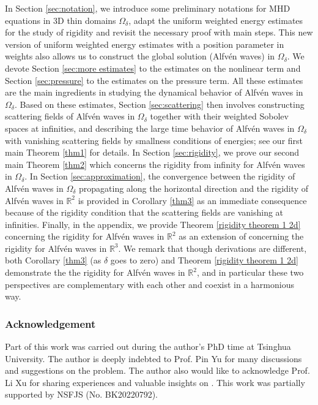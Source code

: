 \documentclass[10pt,reqno]{amsart}
\numberwithin{equation}{section}
\begin{document}
 
 In Section \ref{sec:notation}, we introduce  
 some preliminary notations for  MHD equations in 3D thin domains $\Omega_{\delta}$, adapt 
 the uniform weighted energy estimates for the study of rigidity 
 and revisit the 
 necessary proof with main steps. This new version of uniform weighted energy estimates  with a position parameter in weights 
 also allows us to construct the global solution (Alfv\'en waves) in $\Omega_{\delta}$. We  devote Section \ref{sec:more estimates} 
 to the  estimates on the nonlinear term and  Section \ref{sec:pressure}  
to the estimates on the pressure term. 
All these estimates are the main ingredients in 
studying the dynamical behavior of Alfv\'en waves in $\Omega_{\delta}$. Based on these estimates, Section \ref{sec:scattering} then 
involves constructing scattering fields of Alfv\'en waves in $\Omega_{\delta}$ together with their weighted Sobolev spaces at infinities, and describing the large time behavior of  Alfv\'en waves in $\Omega_{\delta}$ with vanishing scattering fields 
by smallness conditions of energies; see our first main Theorem \ref{thm1} for details. In Section \ref{sec:rigidity}, we prove our second main Theorem \ref{thm2} which concerns the rigidity from infinity for Alfv\'en waves in $\Omega_{\delta}$. In Section \ref{sec:approximation}, the 
convergence between the rigidity of Alfv\'en waves in $\Omega_{\delta}$ propagating along the horizontal direction and the rigidity of Alfv\'en waves in $\mathbb{R}^2$  
is provided in Corollary \ref{thm3} as an immediate consequence because of the rigidity condition that the scattering fields are vanishing at infinities. Finally, in the appendix,  we 
provide Theorem \ref{rigidity theorem 1 2d} concerning the rigidity for Alfv\'en waves in $\mathbb{R}^2$ as an extension of \cite{Li-Yu} concerning  the  rigidity  for Alfv\'en waves in $\mathbb{R}^3$. We remark  that though derivations are different, both Corollary \ref{thm3} (as $\delta$ goes to zero) and 
Theorem \ref{rigidity theorem 1 2d} demonstrate the  the rigidity   for Alfv\'en waves in $\mathbb{R}^2$, and  in particular these two perspectives are complementary with each other and coexist in a harmonious way.  


\subsubsection*{\bf Acknowledgement} 
Part of this 
work was carried out during the author's PhD time at Tsinghua University. 
The author is deeply indebted to Prof. Pin Yu  for many  discussions and suggestions on the problem. 
The author also would like to acknowledge Prof. Li Xu for 
sharing experiences and valuable insights on  \cite{Xu}. This work was partially 
supported by NSFJS (No. BK20220792). 
\end{document}
